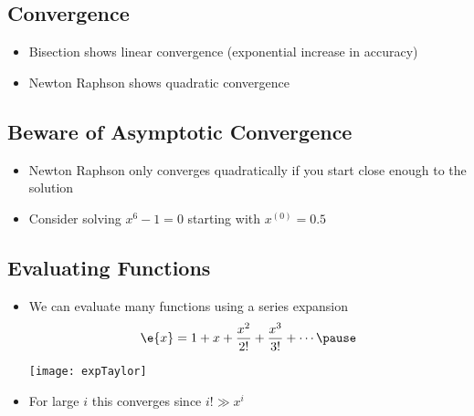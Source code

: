\begin{slide}
\section[-2]{Convergence}

\pb\pause{}
\begin{center}
  \pause
\end{center}
\begin{itemize}
\item Bisection shows linear convergence (exponential increase in
  accuracy)\pause
\item Newton Raphson shows quadratic convergence\pause
\end{itemize}

\end{slide}


\begin{slide}
\section[-2]{Beware of Asymptotic Convergence}

\pb\pause{}
\begin{itemize}
\item Newton Raphson only converges quadratically if you start close
  enough to the solution\pauseh
\item Consider solving $x^6-1=0$ starting with $x^{(0)}=0.5$\pauseh
  \begin{center}
    \pause
  \end{center}
\end{itemize}
\end{slide}


\begin{slide}
\section[-2]{Evaluating Functions}

\begin{PauseHighLight}
  \begin{itemize}
  \item We can evaluate many functions using a series expansion
    \begin{align*}
      \e{x} = 1 + x + \frac{x^2}{2!} + \frac{x^3}{3!} + \cdots\pause
    \end{align*}
    \begin{center}
      \texttt{[image: expTaylor]}\pause
    \end{center}
  \item For large $i$ this converges since $i! \gg x^i$ \pause
  \end{itemize}
\end{PauseHighLight}

\end{slide}

